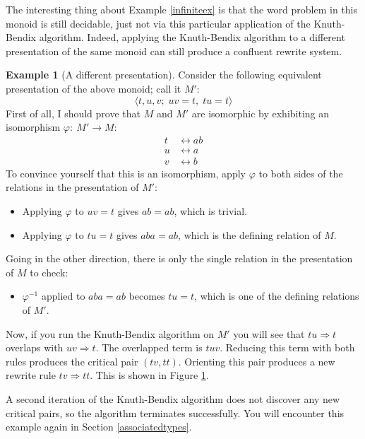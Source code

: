\documentclass[a4paper,headsepline,bibliography=totoc,toc=flat,fleqn,twoside=semi]{scrbook}
\theoremstyle{definition}
\theoremstyle{definition}
\newtheorem{example}{Example}[chapter]
\theoremstyle{definition}
\begin{document}
The interesting thing about Example \ref{infiniteex} is that the word problem in this monoid is still decidable, just not via this particular application of the Knuth-Bendix algorithm. Indeed, applying the Knuth-Bendix algorithm to a different presentation of the same monoid can still produce a confluent rewrite system.

\begin{example}[A different presentation]\label{diffpresex}
Consider the following equivalent presentation of the above monoid; call it $M'$:
\[\langle t, u, v;\; uv=t,\; tu=t\rangle\]
First of all, I should prove that $M$ and $M'$ are isomorphic by exhibiting an isomorphism $\varphi\colon~M'\rightarrow M$:
\begin{align*}
t&\leftrightarrow ab\\
u&\leftrightarrow a\\
v&\leftrightarrow b
\end{align*}
To convince yourself that this is an isomorphism, apply $\varphi$ to both sides of the relations in the presentation of $M'$:
\begin{itemize}
\item Applying $\varphi$ to $uv=t$ gives $ab=ab$, which is trivial.
\item Applying $\varphi$ to $tu=t$ gives $aba=ab$, which is the defining relation of $M$.
\end{itemize}
Going in the other direction, there is only the single relation in the presentation of $M$ to check:
\begin{itemize}
\item $\varphi^{-1}$ applied to $aba=ab$ becomes $tu=t$, which is one of the defining relations of $M'$.
\end{itemize}

Now, if you run the Knuth-Bendix algorithm on $M'$ you will see that $tu\Rightarrow t$ overlaps with $uv\Rightarrow t$. The overlapped term is $tuv$. Reducing this term with both rules produces the critical pair $(tv, tt)$. Orienting this pair produces a new rewrite rule $tv\Rightarrow tt$. This is shown in Figure \ref{diffpresfig}.
\begin{figure}\label{diffpresfig}
\begin{center}
\end{center}
\end{figure}

A second iteration of the Knuth-Bendix algorithm does not discover any new critical pairs, so the algorithm terminates successfully. You will encounter this example again in Section \ref{associatedtypes}.
\end{example}
\end{document}
